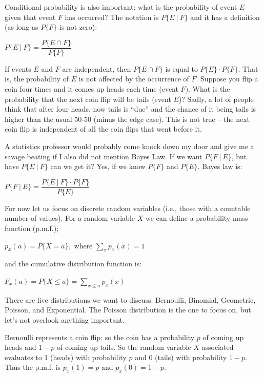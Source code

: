 \documentclass[a4paper]{report}
\begin{document}
Conditional probability is also important: what is the probability of event $E$ given that event $F$ has occurred? The notation is $P\{ E~|~F \}$ and it has a definition (as long as $P\{F\}$ is not zero): 

\begin{center}
	$P\{E~|~F\} = \dfrac{P\{E \cap F\}}{P\{F\}}$
\end{center}

If events $E$ and $F$ are independent, then $P\{E \cap F\}$ is equal to $P\{E\} \cdot P\{F\}$. That is, the probability of $E$ is not affected by the occurrence of $F$. Suppose you flip a coin four times and it comes up heads each time (event $F$). What is the probability that the next coin flip will be tails (event $E$)? Sadly, a lot of people think that after four heads, now tails is ``due'' and the chance of it being tails is higher than the usual 50-50 (minus the edge case). This is not true -- the next coin flip is independent of all the coin flips that went before it.

A statistics professor would probably come knock down my door and give me a savage beating if I also did not mention Bayes Law. If we want $P\{ F~|~E \}$, but have $P\{ E~|~F \}$ can we get it? Yes, if we know $P\{F\}$ and $P\{E\}$. Bayes law is:

\begin{center}
	$P\{F~|~E\} = \dfrac{P\{E~|~F\} \cdot P\{F\}}{P\{E\}}$
\end{center}

For now let us focus on discrete random variables (i.e., those with a countable number of values). For a random variable $X$ we can define a probability mass function (p.m.f.);

\begin{center}
	$p_{x}(a) = P \{ X = a \},$ where $\sum\limits_{x}^{~} p_{x}(x) = 1$
\end{center}
	and the cumulative distribution function is:
\begin{center}
	$F_{x}(a) = P \{ X \leq a \} = \sum\limits_{x \leq a} p_{x}(x)$
\end{center}

There are five distributions we want to discuss: Bernoulli, Binomial, Geometric, Poisson, and Exponential. The Poisson distribution is the one to focus on, but let's not overlook anything important.

Bernoulli represents a coin flip: so the coin has a probability $p$ of coming up heads and $1-p$ of coming up tails. So the random variable $X$ associated evaluates to 1 (heads) with probability $p$ and 0 (tails) with probability $1-p$. Thus the p.m.f. is $p_{x}(1) = p$ and $p_{x}(0) = 1 - p$. 
\end{document}
